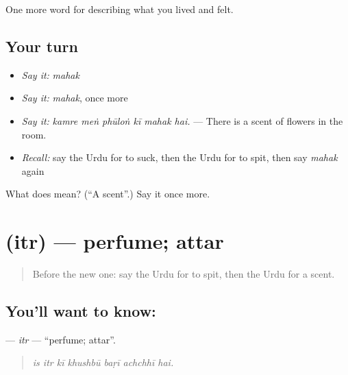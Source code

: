\begin{grammarlens}[title={What you've built}]
One more word for describing what you lived and felt.
\end{grammarlens}

\subsection*{Your turn}
\begin{itemize}
\raggedright
  \item \emph{Say it:} \emph{mahak}
  \item \emph{Say it:} \emph{mahak}, once more
  \item \emph{Say it:} \emph{kamre meṅ phūloṅ kī mahak hai.} — There is a scent of flowers in the room.
  \item \emph{Recall:} say the Urdu for to suck, then the Urdu for to spit, then say \emph{mahak} again
\end{itemize}

\begin{tcolorbox}[breakable,colback=teal!4,colframe=teal!35!black,title={Before you move on}]
What does  mean? (\textquotedblleft{}A scent\textquotedblright{}.) Say it once more.
\end{tcolorbox}
\section[\texorpdfstring{\ur{عطر} (itr)}{عطر (itr)}]{ (itr) — perfume; attar}

\label{lesson:UR-C468-itr}



\begin{quote}
Before the new one: say the Urdu for to spit, then the Urdu for a scent.
\end{quote}

\subsection*{You'll want to know: }
\textbf{} — \emph{itr} — \textquotedblleft{}perfume; attar\textquotedblright{}.

\begin{quote}
      
\end{quote}

\begin{quote}
\emph{is itr kī khushbū baṛī achchhī hai.}
\end{quote}

